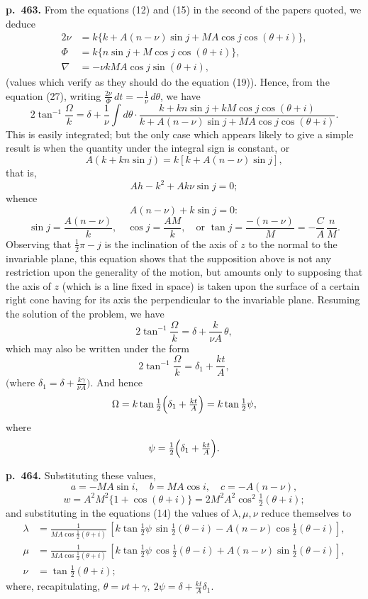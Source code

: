 \documentclass[11pt]{article}
\begin{document}
\bigskip
\noindent\textbf{p.~463.} From the equations (12) and (15) in the second of the papers quoted, we deduce
\[
\begin{aligned}
2\nu &= k\{k + A(n - \nu)\sin j + MA \cos j \cos(\theta + i)\},\\
\Phi &= k\{n\sin j + M\cos j \cos(\theta + i)\},\\
\nabla &= -\nu kMA\cos j \sin(\theta + i),
\end{aligned}
\]
(values which verify as they should do the equation (19)). Hence, from the equation (27), writing $\frac{2\nu}{\Phi}\,dt = -\frac{1}{\nu}\,d\theta$, we have
\[ 2\tan^{-1}\frac{\Omega}{k} = \delta + \frac{1}{\nu}\int d\theta \cdot \frac{k + kn\sin j + kM\cos j \cos(\theta + i)}{k + A(n - \nu)\sin j + MA\cos j \cos(\theta + i)}. \]
This is easily integrated; but the only case which appears likely to give a simple result is when the quantity under the integral sign is constant, or
\[ A(k + kn\sin j) = k[k + A(n - \nu)\sin j], \]
that is,
\[ Ah - k^2 + Ak\nu \sin j = 0; \]
whence
\[ A(n - \nu) + k\sin j = 0: \]
\[ \sin j = \frac{A(n - \nu)}{k},\quad \cos j = \frac{AM}{k},\quad \text{or } \tan j = \frac{-(n - \nu)}{M} = -\frac{C}{A}\,\frac{n}{M}. \]
Observing that $\tfrac{1}{2}\pi - j$ is the inclination of the axis of $z$ to the normal to the invariable plane, this equation shows that the supposition above is not any restriction upon the generality of the motion, but amounts only to supposing that the axis of $z$ (which is a line fixed in space) is taken upon the surface of a certain right cone having for its axis the perpendicular to the invariable plane. Resuming the solution of the problem, we have
\[ 2\tan^{-1}\frac{\Omega}{k} = \delta + \frac{k}{\nu A}\,\theta, \]
which may also be written under the form
\[ 2\tan^{-1}\frac{\Omega}{k} = \delta_1 + \frac{kt}{A}, \]
$\bigl(\text{where } \delta_1 = \delta + \tfrac{k\gamma}{\nu A}\bigr)$. And hence
\[ \Omega = k\tan\tfrac{1}{2}\Bigl(\delta_1 + \tfrac{kt}{A}\Bigr) = k\tan\tfrac{1}{2}\psi, \]
where
\[ \psi = \tfrac{1}{2}\Bigl(\delta_1 + \tfrac{kt}{A}\Bigr). \]

\bigskip
\noindent\textbf{p.~464.} Substituting these values,
\[ a = -MA\sin i,\quad b = MA\cos i,\quad c = -A(n - \nu), \]
\[ w = A^2 M^2 \{1 + \cos(\theta + i)\} = 2M^2 A^2 \cos^2 \tfrac{1}{2}(\theta + i); \]
and substituting in the equations (14) the values of $\lambda, \mu, \nu$ reduce themselves to
\[
\begin{aligned}
\lambda &= \tfrac{1}{MA\cos\tfrac{1}{2}(\theta + i)}\,[k\tan\tfrac{1}{2}\psi\,\sin\tfrac{1}{2}(\theta - i) - A(n - \nu)\cos\tfrac{1}{2}(\theta - i)],\\
\mu &= \tfrac{1}{MA\cos\tfrac{1}{2}(\theta + i)}\,[k\tan\tfrac{1}{2}\psi\,\cos\tfrac{1}{2}(\theta - i) + A(n - \nu)\sin\tfrac{1}{2}(\theta - i)],\\
\nu &= \tan\tfrac{1}{2}(\theta + i);
\end{aligned}
\]
where, recapitulating, $\theta = \nu t + \gamma,\ 2\psi = \delta + \tfrac{kt}{A}\delta_1$.
\end{document}
